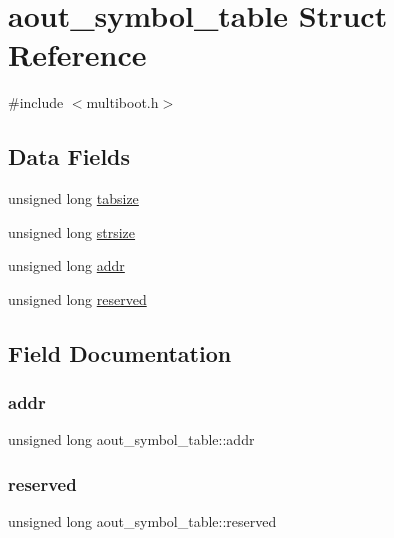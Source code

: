 \hypertarget{structaout__symbol__table}{}\section{aout\+\_\+symbol\+\_\+table Struct Reference}
\label{structaout__symbol__table}


{\ttfamily \#include $<$multiboot.\+h$>$}

\subsection*{Data Fields}
\begin{DoxyCompactItemize}
\item 
unsigned long \hyperlink{structaout__symbol__table_ac3c6d6aa9cdf59ae4ef83d2aaa679394}{tabsize}
\item 
unsigned long \hyperlink{structaout__symbol__table_a62501946eea0a9aa53864aec0fbf8c16}{strsize}
\item 
unsigned long \hyperlink{structaout__symbol__table_a0bc70ec3d3eb386fb68d3eaec4e96e9d}{addr}
\item 
unsigned long \hyperlink{structaout__symbol__table_a73a9a85832f1259e78ead3e0d61628b0}{reserved}
\end{DoxyCompactItemize}


\subsection{Field Documentation}
\mbox{\label{structaout__symbol__table_a0bc70ec3d3eb386fb68d3eaec4e96e9d}} 
\subsubsection{\texorpdfstring{addr}{addr}}
{\footnotesize\ttfamily unsigned long aout\+\_\+symbol\+\_\+table\+::addr}

\mbox{\label{structaout__symbol__table_a73a9a85832f1259e78ead3e0d61628b0}} 
\subsubsection{\texorpdfstring{reserved}{reserved}}
{\footnotesize\ttfamily unsigned long aout\+\_\+symbol\+\_\+table\+::reserved}

